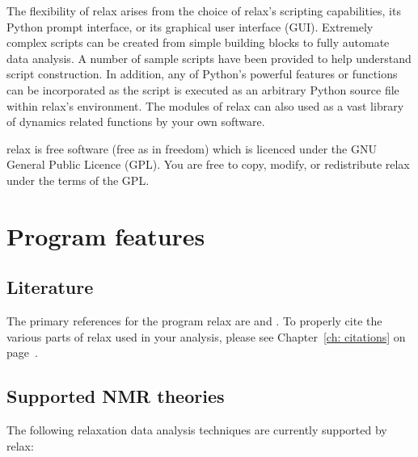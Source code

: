 The flexibility of relax arises from the choice of relax's scripting capabilities, its Python prompt interface, or its graphical user interface (GUI).  Extremely complex scripts can be created from simple building blocks to fully automate data analysis.  A number of sample scripts have been provided to help understand script construction. In addition, any of Python's powerful features or functions can be incorporated as the script is executed as an arbitrary Python source file within relax's environment.  The modules of relax can also used as a vast library of dynamics related functions by your own software.

relax is free software (free as in freedom) which is licenced under the GNU General Public Licence (GPL). You are free to copy, modify, or redistribute relax under the terms of the GPL. 



\section{Program features}



\subsection{Literature}

The primary references for the program relax are \citet{dAuvergneGooley08a} and \citet{dAuvergneGooley08b}.  To properly cite the various parts of relax used in your analysis, please see Chapter~\ref{ch: citations} on page~\pageref{ch: citations}.



\subsection{Supported NMR theories}

The following relaxation data analysis techniques are currently supported by relax:

